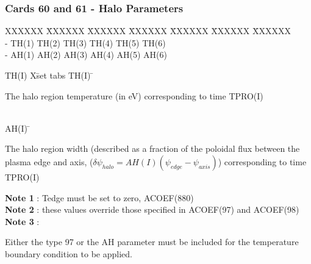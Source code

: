 \newpage \subsubsection{Cards 60 and 61 - Halo Parameters}
\begin{tabbing}
XXXXXX \= XXXXXX \= XXXXXX \= XXXXXX \= XXXXXX \= XXXXXX \=
XXXXXX       \\
\footnotesize  - \>\footnotesize TH(1)  \>\footnotesize TH(2) \>\footnotesize
TH(3) \>\footnotesize TH(4) \>\footnotesize TH(5) \>\footnotesize TH(6)\\
\footnotesize  - \>\footnotesize AH(1)  \>\footnotesize AH(2) \>\footnotesize
AH(3) \>\footnotesize AH(4) \>\footnotesize AH(5) \>\footnotesize AH(6)
\end{tabbing}
\begin{tabbing}
TH(I) X\=  set tabs \kill
TH(I)  \=  \parbox[t]{\width}{The halo region temperature (in eV) corresponding to time
TPRO(I) }\\
AH(I)  \=  \parbox[t]{\width}{The halo region width (described as a
fraction of the poloidal flux between the plasma edge and axis,
($\delta \psi_{halo}=AH(I) (\psi_{edge}-\psi_{axis})$) corresponding to time
TPRO(I) }
\end{tabbing}
{\bf Note 1} :  Tedge must be set to zero, ACOEF(880) \\
{\bf Note 2} : these values override those specified in
ACOEF(97) and ACOEF(98)
{\bf Note 3} : \parbox[t]{\width}{Either the type 97 or the AH parameter must be included
for the temperature boundary condition to be applied.}

